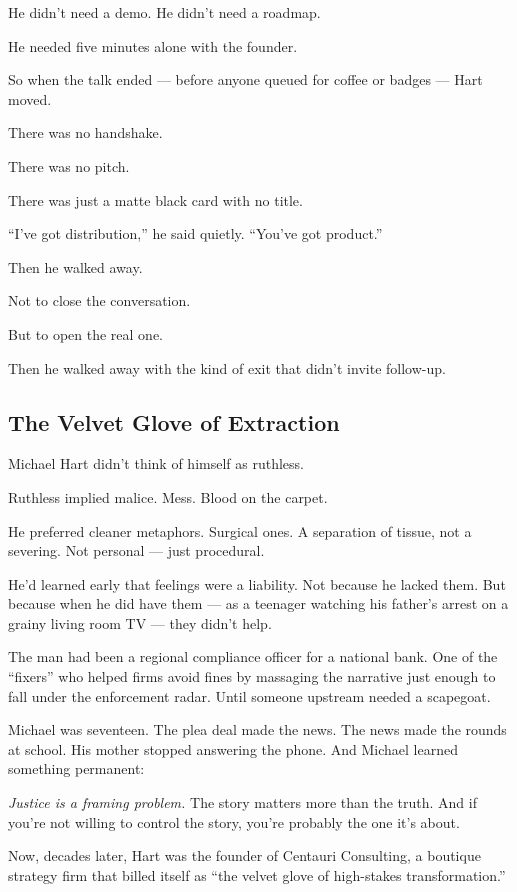 He didn’t need a demo. 
He didn’t need a roadmap.

He needed five minutes alone with the founder.

So when the talk ended --- before anyone queued for coffee or badges --- Hart moved.

There was no handshake. 

There was no pitch. 

There was just a matte black card with no title.

``I’ve got distribution,'' 
he said quietly. 
``You’ve got product.''

Then he walked away.

Not to close the conversation.

But to open the real one.

Then he walked away with the kind of exit that didn’t invite follow-up.





\subsection{The Velvet Glove of Extraction}

Michael Hart didn’t think of himself as ruthless.

Ruthless implied malice. Mess. Blood on the carpet.

He preferred cleaner metaphors. Surgical ones.
A separation of tissue, not a severing.
Not personal — just procedural.

He’d learned early that feelings were a liability.
Not because he lacked them.
But because when he did have them — as a teenager watching his father’s arrest on a grainy living room TV — they didn’t help.

The man had been a regional compliance officer for a national bank. One of the “fixers” who helped firms avoid fines by massaging the narrative just enough to fall under the enforcement radar.
Until someone upstream needed a scapegoat.

Michael was seventeen.
The plea deal made the news. The news made the rounds at school.
His mother stopped answering the phone.
And Michael learned something permanent:

\textit{Justice is a framing problem.}
The story matters more than the truth.
And if you’re not willing to control the story, you’re probably the one it’s about.

Now, decades later, Hart was the founder of Centauri Consulting, a boutique strategy firm that billed itself as “the velvet glove of high-stakes transformation.”

